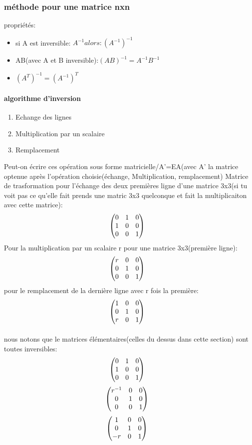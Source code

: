 \documentclass[a4paper,10pt]{article}
\begin{document}
\subsubsection{méthode pour une matrice nxn}
propriétés:
\begin{itemize}
 \item si A est inversible: $A^{-1}alors:(A^{-1})^{-1}$
 \item AB(avec A et B inversible):$(AB)^{-1}=A^{-1}B^{-1}$
 \item $(A^T)^{-1}=(A^{-1})^T$
\end{itemize}
\paragraph{algorithme d'inversion}
\begin{enumerate}
 \item Echange des lignes
 \item Multiplication par un scalaire
 \item Remplacement
\end{enumerate}
Peut-on écrire ces opération sous forme matricielle/A'=EA(avec A' la matrice optenue après l'opération choisie(échange, Multiplication, remplacement)
\newline
Matrice de trasformation pour l'échange des deux premières ligne d'une matrice 3x3(si tu voit pas ce qu'elle fait prends une matric 3x3 quelconque et fait la multiplicaiton avec cette matrice):
\newline
\[
\begin{pmatrix}
0&1&0\cr
1&0&0\cr
0&0&1\cr
\end{pmatrix}
\]
\newline
Pour la multiplication par un scalaire r pour une matrice 3x3(première ligne):
\[
\begin{pmatrix}
r&0&0\cr
0&1&0\cr
0&0&1\cr
\end{pmatrix}
\]
\newline
pour le remplacement de la dernière ligne avec r fois la première:
\[
\begin{pmatrix}
1&0&0\cr
0&1&0\cr
r&0&1\cr
\end{pmatrix}
\]
\paragraph{}
nous notons que le matrices élémentaires(celles du dessus dans cette section) sont toutes inversibles:
\[
\begin{pmatrix}
0&1&0\cr
1&0&0\cr
0&0&1\cr
\end{pmatrix}
\]
\newline
\[
\begin{pmatrix}
r^{-1}&0&0\cr
0&1&0\cr
0&0&1\cr
\end{pmatrix}
\]
\newline
\[
\begin{pmatrix}
1&0&0\cr
0&1&0\cr
-r&0&1\cr
\end{pmatrix}
\]
\end{document}
